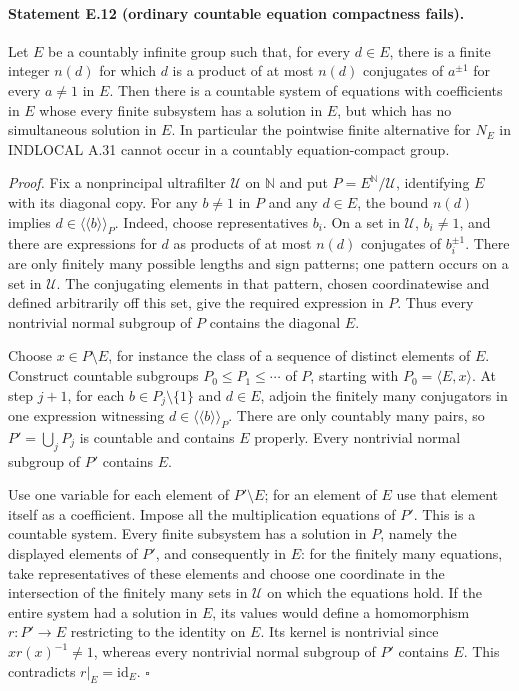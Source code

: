 \paragraph{Statement E.12 (ordinary countable equation compactness fails).}
Let $E$ be a countably infinite group such that, for every $d\in E$,
there is a finite integer $n(d)$ for which $d$ is a product of at most
$n(d)$ conjugates of $a^{\pm1}$ for every $a\ne1$ in $E$.
Then there is a countable system of equations with coefficients in $E$
whose every finite subsystem has a solution in $E$, but which has no
simultaneous solution in $E$.
In particular the pointwise finite alternative for $N_E$ in
INDLOCAL A.31 cannot occur in a countably equation-compact group.

\emph{Proof.}
Fix a nonprincipal ultrafilter $\mathcal U$ on $\mathbb N$ and put
$P=E^{\mathbb N}/\mathcal U$, identifying $E$ with its diagonal copy.
For any $b\ne1$ in $P$ and any $d\in E$, the bound $n(d)$ implies
$d\in\langle\!\langle b\rangle\!\rangle_P$.
Indeed, choose representatives $b_i$. On a set in $\mathcal U$,
$b_i\ne1$, and there are expressions for $d$ as products of at most
$n(d)$ conjugates of $b_i^{\pm1}$.
There are only finitely many possible lengths and sign patterns;
one pattern occurs on a set in $\mathcal U$.
The conjugating elements in that pattern, chosen coordinatewise and
defined arbitrarily off this set, give the required expression in $P$.
Thus every nontrivial normal subgroup of $P$ contains the diagonal $E$.

Choose $x\in P\setminus E$, for instance the class of a sequence
of distinct elements of $E$. Construct countable subgroups
$P_0\le P_1\le\cdots$ of $P$, starting with $P_0=\langle E,x\rangle$.
At step $j+1$, for each $b\in P_j\setminus\{1\}$ and $d\in E$,
adjoin the finitely many conjugators in one expression witnessing
$d\in\langle\!\langle b\rangle\!\rangle_P$.
There are only countably many pairs, so
$P'=\bigcup_jP_j$ is countable and contains $E$ properly.
Every nontrivial normal subgroup of $P'$ contains $E$.

Use one variable for each element of $P'\setminus E$; for an element
of $E$ use that element itself as a coefficient.
Impose all the multiplication equations of $P'$.
This is a countable system. Every finite subsystem has a solution
in $P$, namely the displayed elements of $P'$, and consequently in
$E$: for the finitely many equations, take representatives of these
elements and choose one coordinate in the intersection of the
finitely many sets in $\mathcal U$ on which the equations hold.
If the entire system had a solution in $E$, its values would define
a homomorphism $r:P'\to E$ restricting to the identity on $E$.
Its kernel is nontrivial since
$x r(x)^{-1}\ne1$, whereas every nontrivial normal subgroup of $P'$
contains $E$. This contradicts $r|_E=\mathrm{id}_E$.
\hfill$\square$


